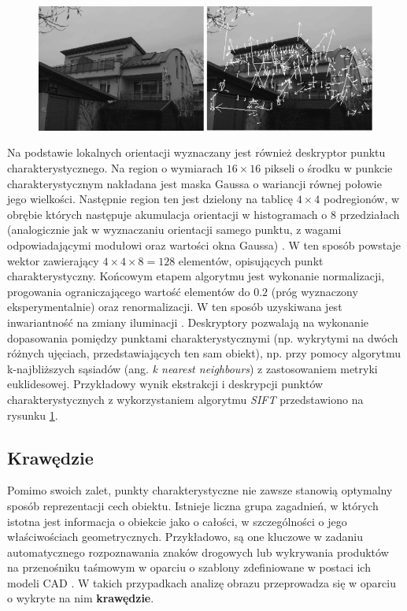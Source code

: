 \begin{figure}[!htb]
	\begin{center}
		\includegraphics[width=12cm]{images/sift_extraction_description_example.png}
	\end{center}	
\label{fig:SIFT_przyklad}
\end{figure}

Na podstawie lokalnych orientacji wyznaczany jest również deskryptor punktu charakterystycznego. Na region o wymiarach $16 \times 16$ pikseli o środku w punkcie charakterystycznym nakładana jest maska Gaussa o wariancji równej połowie jego wielkości. Następnie region ten jest dzielony na tablicę $4 \times 4$ podregionów, w obrębie których następuje akumulacja orientacji w histogramach o $8$ przedziałach (analogicznie jak w wyznaczaniu orientacji samego punktu, z wagami odpowiadającymi modułowi oraz wartości okna Gaussa) \cite{Lowe2004}. W ten sposób powstaje wektor zawierający $4 \times 4 \times 8 = 128$ elementów, opisujących punkt charakterystyczny. Końcowym etapem algorytmu jest wykonanie normalizacji, progowania ograniczającego wartość elementów do $0.2$ (próg wyznaczony eksperymentalnie) oraz renormalizacji. W ten sposób uzyskiwana jest inwariantność na zmiany iluminacji \cite{Lowe2004}. Deskryptory pozwalają na wykonanie dopasowania pomiędzy punktami charakterystycznymi (np. wykrytymi na dwóch różnych ujęciach, przedstawiających ten sam obiekt), np. przy pomocy algorytmu k-najbliższych sąsiadów (ang. \textit{k nearest neighbours}) z zastosowaniem metryki euklidesowej. Przykładowy wynik ekstrakcji i deskrypcji punktów charakterystycznych z wykorzystaniem algorytmu \textit{SIFT} przedstawiono na rysunku \ref{fig:SIFT_przyklad}.

\subsection{Krawędzie}
\label{subsec:Krawedzie}
Pomimo swoich zalet, punkty charakterystyczne nie zawsze stanowią optymalny sposób reprezentacji cech obiektu. Istnieje liczna grupa zagadnień, w których istotna jest informacja o obiekcie jako o całości, w szczególności o jego właściwościach geometrycznych. Przykładowo, są one kluczowe w zadaniu automatycznego rozpoznawania znaków drogowych lub wykrywania produktów na przenośniku taśmowym w oparciu o szablony zdefiniowane w postaci ich modeli CAD \cite{Treiber2010}. W takich przypadkach analizę obrazu przeprowadza się w oparciu o wykryte na nim \textbf{krawędzie}.

